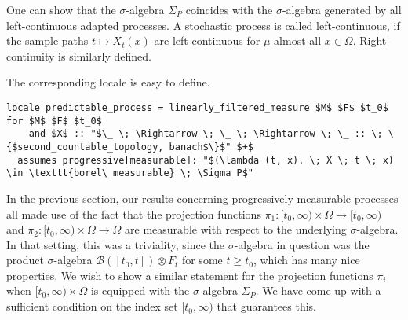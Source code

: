 \begin{remark}
	One can show that the $\sigma$-algebra $\Sigma_P$ coincides with the $\sigma$-algebra generated by all left-continuous adapted processes. A stochastic process is called left-continuous, if the sample paths $t \mapsto X_t(x)$ are left-continuous for $\mu$-almost all $x \in \Omega$. Right-continuity is similarly defined.
\end{remark}

The corresponding locale is easy to define.

\begin{isadefinition}
{\small
\begin{lstlisting}[style=isabelle]
locale predictable_process = linearly_filtered_measure $M$ $F$ $t_0$ for $M$ $F$ $t_0$
	and $X$ :: "$\_ \; \Rightarrow \; \_ \; \Rightarrow \; \_ :: \; \{$second_countable_topology, banach$\}$" $+$
  assumes progressive[measurable]: "$(\lambda (t, x). \; X \; t \; x) \in \texttt{borel\_measurable} \; \Sigma_P$"
\end{lstlisting}
}
\end{isadefinition}

In the previous section, our results concerning progressively measurable processes all made use of the fact that the projection functions $\pi_1 : [t_0, \infty) \times \Omega \rightarrow [t_0, \infty)$ and $\pi_2 : [t_0, \infty) \times \Omega \rightarrow \Omega$ are measurable with respect to the underlying $\sigma$-algebra. In that setting, this was a triviality, since the $\sigma$-algebra in question was the product $\sigma$-algebra $\mathcal{B}([t_0, t]) \otimes F_t$ for some $t \ge t_0$, which has many nice properties. We wish to show a similar statement for the projection functions $\pi_i$ when $[t_0, \infty) \times \Omega$ is equipped with the $\sigma$-algebra $\Sigma_P$. We have come up with a sufficient condition on the index set $[t_0, \infty)$ that guarantees this.

